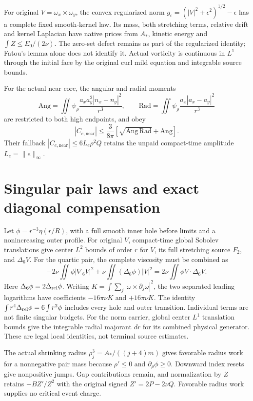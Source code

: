 \documentclass[11pt]{article}
\begin{document}
For original $V=\omega_x\times\omega_y$, the convex regularized norm
$g_\epsilon=(|V|^2+\epsilon^2)^{1/2}-\epsilon$ has a complete fixed
smooth-kernel law. Its mass, both stretching terms, relative drift and
kernel Laplacian have native prices from $A_*$, kinetic energy and
$\int Z\le E_0/(2\nu)$. The zero-set defect remains as part of the
regularized identity; Fatou's lemma alone does not identify it.
Actual vorticity is continuous in $L^1$ through the initial face by the
original curl mild equation and integrable source bounds.

For the actual near core, the angular and radial moments
\[
 \mathrm{Ang}=\iint\psi_\rho\frac{a_xa_y^2|n_x-n_y|^2}{r^3},\qquad
 \mathrm{Rad}=\iint\psi_\rho\frac{a_x|a_x-a_y|^2}{r^3}
\]
are restricted to both high endpoints, and obey
\[
 |C_{e,\mathrm{near}}|\le\frac3{8\pi}
 [\sqrt{\mathrm{Ang}\,\mathrm{Rad}}+\mathrm{Ang}].
\]
Their fallback $|C_{e,\mathrm{near}}|\le6L_e\rho^2Q$ retains the
unpaid compact-time amplitude $L_e=\|e\|_\infty$.

\section{Singular pair laws and exact diagonal compensation}
Let $\phi=r^{-3}\eta(r/R)$, with a full smooth inner hole before
limits and a nonincreasing outer profile. For original $V$, compact-time
global Sobolev translations give center $L^2$ bounds of order $r$ for
$V$, its full stretching source $F_2$, and $\Delta_6V$.
For the quartic pair, the complete viscosity must be combined as
\[
 -2\nu\iint\phi|\nabla_6V|^2
 +\nu\iint(\Delta_6\phi)|V|^2
 =2\nu\iint\phi V\cdot\Delta_6V.
\]
Here $\Delta_6\phi=2\Delta_{\rm rel}\phi$.
Writing $K=\int\sum_j|\omega\times\partial_j\omega|^2$, the two
separated leading logarithms have coefficients $-16\pi\nu K$ and
$+16\pi\nu K$. The identity
$\int r^4\Delta_{\rm rel}\phi=6\int r^2\phi$ includes every hole
and outer transition. Individual terms are not finite singular budgets.
For the norm carrier, global center $L^1$ translation bounds give the
integrable radial majorant $dr$ for its combined physical generator.
These are legal local identities, not terminal source estimates.

The actual shrinking radius $\rho_j^3=A_*/((j+4)m)$ gives favorable
radius work for a nonnegative pair mass because
$\rho'\le0$ and $\partial_\rho\phi\ge0$.
Downward index resets give nonpositive jumps. Gap contributions remain,
and normalization by $Z$ retains $-BZ'/Z^2$ with the original signed
$Z'=2P-2\nu Q$. Favorable radius work supplies no critical event charge.
\end{document}
